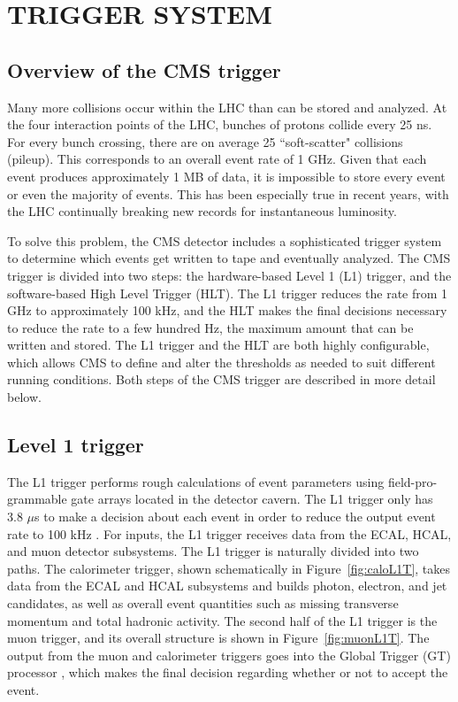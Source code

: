 \chapter{TRIGGER SYSTEM}
\label{chap:Trigger}

\section{Overview of the CMS trigger}
\label{sec:trigOverview}
Many more collisions occur within the LHC than can be stored and analyzed. At the four interaction points of the LHC, bunches of protons collide every 25 ns. For every bunch crossing, there are on average 25 ``soft-scatter" collisions (pileup). This corresponds to an overall event rate of 1 GHz. Given that each event produces approximately 1 MB of data, it is impossible to store every event or even the majority of events. This has been especially true in recent years, with the LHC continually breaking new records for instantaneous luminosity. 

To solve this problem, the CMS detector includes a sophisticated trigger system to determine which events get written to tape and eventually analyzed. The CMS trigger  is divided into two steps: the hardware-based Level 1 (L1) trigger, and the software-based High Level Trigger (HLT). The L1 trigger reduces the rate from 1 GHz to approximately 100 kHz, and the HLT makes the final decisions necessary to reduce the rate to a few hundred Hz, the maximum amount that can be written and stored. The L1 trigger and the HLT are both highly configurable, which allows CMS to define and alter the thresholds as needed to suit different running conditions. Both steps of the CMS trigger are described in more detail below. 


\section{Level 1 trigger}
\label{sec:L1}
The L1 trigger performs rough calculations of event parameters using field-pro-grammable gate arrays located in the detector cavern. The L1 trigger only has 3.8 $\mu$s to make a decision about each event in order to reduce the output event rate to 100 kHz \cite{L1trig}. For inputs, the L1 trigger receives data from the ECAL, HCAL, and muon detector subsystems. The L1 trigger is naturally divided into two paths. The calorimeter trigger, shown schematically in Figure~\ref{fig:caloL1T}, takes data from the ECAL and HCAL subsystems and builds photon, electron, and jet candidates, as well as overall event quantities such as missing transverse momentum and total hadronic activity. The second half of the L1 trigger is the muon trigger, and its overall structure is shown in Figure~\ref{fig:muonL1T}. The output from the muon and calorimeter triggers goes into the Global Trigger (GT) processor \cite{L1_GT}, which makes the final decision regarding whether or not to accept the event. 

